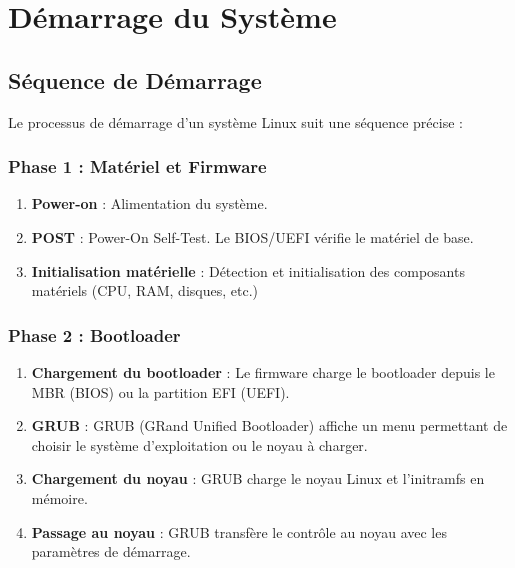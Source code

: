 \documentclass[12pt,a4paper]{article}
\begin{document}

\section{Démarrage du Système}

\subsection{Séquence de Démarrage}

Le processus de démarrage d'un système Linux suit une séquence précise :

\subsubsection{Phase 1 : Matériel et Firmware}

\begin{enumerate}
    \item \textbf{Power-on} : Alimentation du système.
    
    \item \textbf{POST} : Power-On Self-Test. Le BIOS/UEFI vérifie le matériel de base.
    
    \item \textbf{Initialisation matérielle} : Détection et initialisation des composants matériels (CPU, RAM, disques, etc.)
\end{enumerate}

\subsubsection{Phase 2 : Bootloader}

\begin{enumerate}
    \item \textbf{Chargement du bootloader} : Le firmware charge le bootloader depuis le MBR (BIOS) ou la partition EFI (UEFI).
    
    \item \textbf{GRUB} : GRUB (GRand Unified Bootloader) affiche un menu permettant de choisir le système d'exploitation ou le noyau à charger.
    
    \item \textbf{Chargement du noyau} : GRUB charge le noyau Linux et l'initramfs en mémoire.
    
    \item \textbf{Passage au noyau} : GRUB transfère le contrôle au noyau avec les paramètres de démarrage.
\end{enumerate}
\end{document}
